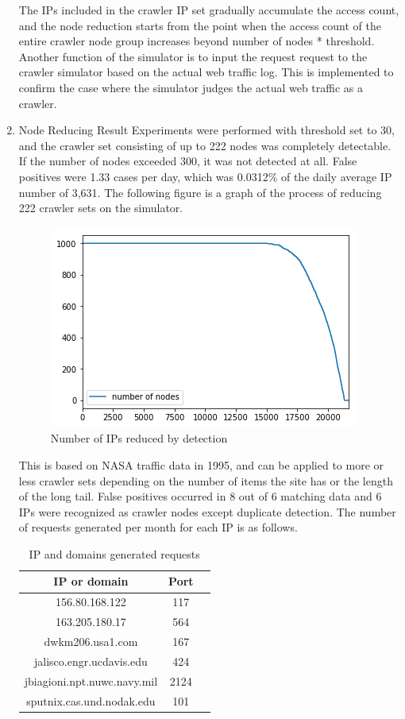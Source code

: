 \documentclass[letterpaper, 10 pt, conference]{ieeeconf}
\begin{document}
\begin{enumerate}
The IPs included in the crawler IP set gradually accumulate the access count, and the node reduction starts from the point when the access count of the entire crawler node group increases beyond {number of nodes} * {threshold}.
Another function of the simulator is to input the request request to the crawler simulator based on the actual web traffic log. This is implemented to confirm the case where the simulator judges the actual web traffic as a crawler.
\newline
\item Node Reducing Result
\newline 
Experiments were performed with threshold set to 30, and the crawler set consisting of up to 222 nodes was completely detectable. If the number of nodes exceeded 300, it was not detected at all. False positives were 1.33 cases per day, which was 0.0312\% of the daily average IP number of 3,631. The following figure is a graph of the process of reducing 222 crawler sets on the simulator.

\begin{figure}[H]
    \centering
    \includegraphics[width=0.7\columnwidth]{figs/figure_06_nr.png}
    \caption{Number of IPs reduced by detection}
    \label{fig:my_label}
\end{figure}

This is based on NASA traffic data in 1995, and can be applied to more or less crawler sets depending on the number of items the site has or the length of the long tail.
False positives occurred in 8 out of 6 matching data and 6 IPs were recognized as crawler nodes except duplicate detection. The number of requests generated per month for each IP is as follows.


\begin{table}
  \caption{IP and domains generated requests}
  \label{tab:freq}
  \begin{tabular}{ccl}
    \toprule
    IP or domain&Port\\
    \midrule
    156.80.168.122 & 117\\
    163.205.180.17 & 564\\
    dwkm206.usa1.com & 167\\
    jalisco.engr.ucdavis.edu & 424\\
    jbiagioni.npt.nuwc.navy.mil & 2124\\
    sputnix.cas.und.nodak.edu & 101\\
  \bottomrule
\end{tabular}
\end{table}



\end{enumerate}
\end{document}
